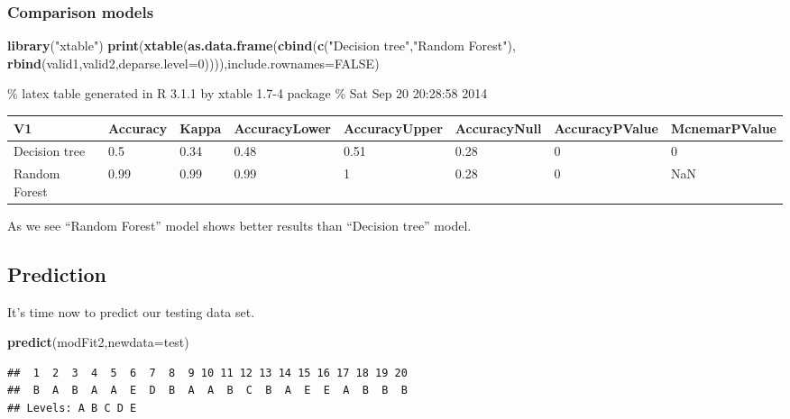 \documentclass[]{article}
\newenvironment{Shaded}{\begin{snugshade}}{\end{snugshade}}
\newcommand{\KeywordTok}[1]{\textcolor[rgb]{0.13,0.29,0.53}{\textbf{{#1}}}}
\newcommand{\DataTypeTok}[1]{\textcolor[rgb]{0.13,0.29,0.53}{{#1}}}
\newcommand{\DecValTok}[1]{\textcolor[rgb]{0.00,0.00,0.81}{{#1}}}
\newcommand{\StringTok}[1]{\textcolor[rgb]{0.31,0.60,0.02}{{#1}}}
\newcommand{\OtherTok}[1]{\textcolor[rgb]{0.56,0.35,0.01}{{#1}}}
\newcommand{\NormalTok}[1]{{#1}}
\begin{document}
\begin{Shaded}
\end{Shaded}

\subsubsection{Comparison models}\label{comparison-models}

\begin{Shaded}
\begin{Highlighting}[]
\KeywordTok{library}\NormalTok{(}\StringTok{"xtable"}\NormalTok{)}
\KeywordTok{print}\NormalTok{(}\KeywordTok{xtable}\NormalTok{(}\KeywordTok{as.data.frame}\NormalTok{(}\KeywordTok{cbind}\NormalTok{(}\KeywordTok{c}\NormalTok{(}\StringTok{"Decision tree"}\NormalTok{,}\StringTok{"Random Forest"}\NormalTok{),}
             \KeywordTok{rbind}\NormalTok{(valid1,valid2,}\DataTypeTok{deparse.level=}\DecValTok{0}\NormalTok{)))),}\DataTypeTok{include.rownames=}\OtherTok{FALSE}\NormalTok{)}
\end{Highlighting}
\end{Shaded}

\% latex table generated in R 3.1.1 by xtable 1.7-4 package \% Sat Sep
20 20:28:58 2014

\begin{table}[ht]
\centering
\begin{tabular}{llllllll}
  \hline
V1 & Accuracy & Kappa & AccuracyLower & AccuracyUpper & AccuracyNull & AccuracyPValue & McnemarPValue \\ 
  \hline
Decision tree & 0.5 & 0.34 & 0.48 & 0.51 & 0.28 & 0 & 0 \\ 
  Random Forest & 0.99 & 0.99 & 0.99 & 1 & 0.28 & 0 & NaN \\ 
   \hline
\end{tabular}
\end{table}

As we see ``Random Forest'' model shows better results than ``Decision
tree'' model.

\subsection{Prediction}\label{prediction}

It's time now to predict our testing data set.

\begin{Shaded}
\begin{Highlighting}[]
\KeywordTok{predict}\NormalTok{(modFit2,}\DataTypeTok{newdata=}\NormalTok{test)}
\end{Highlighting}
\end{Shaded}

\begin{verbatim}
##  1  2  3  4  5  6  7  8  9 10 11 12 13 14 15 16 17 18 19 20 
##  B  A  B  A  A  E  D  B  A  A  B  C  B  A  E  E  A  B  B  B 
## Levels: A B C D E
\end{verbatim}
\end{document}
